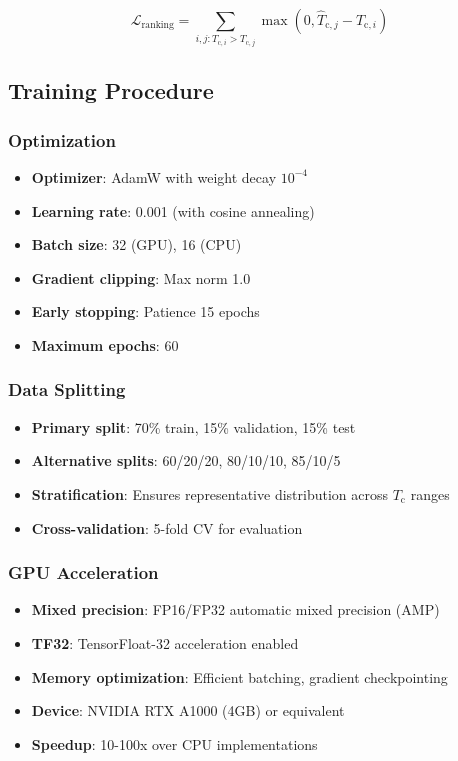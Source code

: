 \documentclass[11pt,a4paper]{article}
\begin{document}
\begin{equation}
\mathcal{L}_{\text{ranking}} = \sum_{i,j: T_{\text{c},i} > T_{\text{c},j}} \max(0, \hat{T}_{\text{c},j} - \hat{T}_{\text{c},i})
\end{equation}

\subsection{Training Procedure}

\subsubsection{Optimization}

\begin{itemize}
    \item \textbf{Optimizer}: AdamW with weight decay $10^{-4}$
    \item \textbf{Learning rate}: 0.001 (with cosine annealing)
    \item \textbf{Batch size}: 32 (GPU), 16 (CPU)
    \item \textbf{Gradient clipping}: Max norm 1.0
    \item \textbf{Early stopping}: Patience 15 epochs
    \item \textbf{Maximum epochs}: 60
\end{itemize}

\subsubsection{Data Splitting}

\begin{itemize}
    \item \textbf{Primary split}: 70\% train, 15\% validation, 15\% test
    \item \textbf{Alternative splits}: 60/20/20, 80/10/10, 85/10/5
    \item \textbf{Stratification}: Ensures representative distribution across $T_{\text{c}}$ ranges
    \item \textbf{Cross-validation}: 5-fold CV for evaluation
\end{itemize}

\subsubsection{GPU Acceleration}

\begin{itemize}
    \item \textbf{Mixed precision}: FP16/FP32 automatic mixed precision (AMP)
    \item \textbf{TF32}: TensorFloat-32 acceleration enabled
    \item \textbf{Memory optimization}: Efficient batching, gradient checkpointing
    \item \textbf{Device}: NVIDIA RTX A1000 (4GB) or equivalent
    \item \textbf{Speedup}: 10-100x over CPU implementations
\end{itemize}
\end{document}
